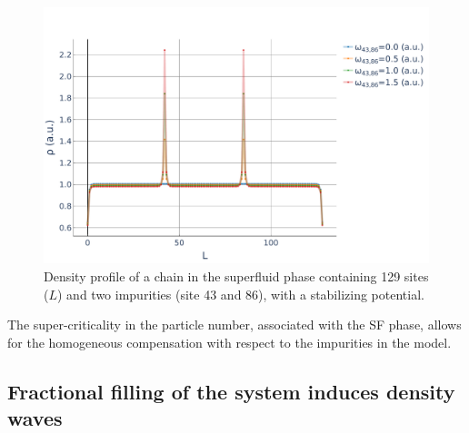 \documentclass[twoside,twocolumn,9pt]{article}
\begin{document}
\begin{center}
  \begin{figure}
      \includegraphics[width=\linewidth]{../code/figures/Density-profiles-SF.pdf}
      \caption{Density profile of a chain in the superfluid phase containing 129 sites ($L$) and two impurities (site 43 and 86), with a stabilizing potential.}
      \label{fig:density-SF}
  \end{figure}
\end{center}
The super-criticality in the particle number, associated with the SF phase, allows for the homogeneous compensation with respect to the impurities in the model.

\subsection{Fractional filling of the system induces density waves}
\end{document}
